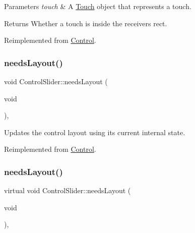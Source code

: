 \begin{DoxyParams}{Parameters}
{\em touch} & A \hyperlink{classTouch}{Touch} object that represents a touch.\\
\hline
\end{DoxyParams}
\begin{DoxyReturn}{Returns}
Whether a touch is inside the receiver\textquotesingle{}s rect. 
\end{DoxyReturn}


Reimplemented from \hyperlink{classControl_a897865e3e4ff50ed827f33966e786c7f}{Control}.

\mbox{\label{classControlSlider_a2325b1df970fb4aff1ccb29aea4a20ea}} 
\subsubsection{\texorpdfstring{needs\+Layout()}{needsLayout()}\hspace{0.1cm}{\footnotesize\ttfamily [1/2]}}
{\footnotesize\ttfamily void Control\+Slider\+::needs\+Layout (\begin{DoxyParamCaption}\item[{void}]{ }\end{DoxyParamCaption})\hspace{0.3cm}{\ttfamily [override]}, {\ttfamily [virtual]}}

Updates the control layout using its current internal state. 

Reimplemented from \hyperlink{classControl_aa3c7bd1c9d2a072c037c6c9232a336a5}{Control}.

\mbox{\label{classControlSlider_a52ab7abbbcefc12704917d04dfea67c9}} 
\subsubsection{\texorpdfstring{needs\+Layout()}{needsLayout()}\hspace{0.1cm}{\footnotesize\ttfamily [2/2]}}
{\footnotesize\ttfamily virtual void Control\+Slider\+::needs\+Layout (\begin{DoxyParamCaption}\item[{void}]{ }\end{DoxyParamCaption})\hspace{0.3cm}{\ttfamily [override]}, {\ttfamily [virtual]}}

